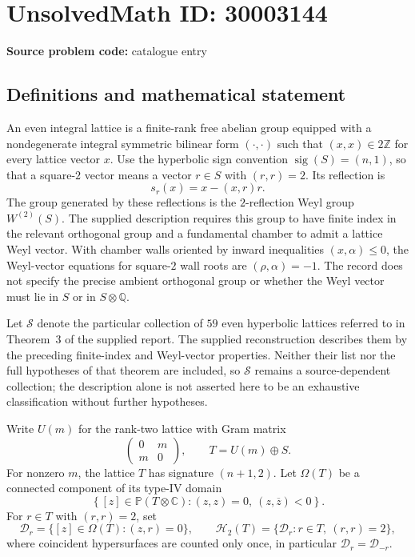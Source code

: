 \documentclass[11pt]{article}
\newcommand{\Z}{\mathbb{Z}}
\newcommand{\Q}{\mathbb{Q}}
\newcommand{\C}{\mathbb{C}}
\newcommand{\PP}{\mathbb{P}}
\begin{document}
\section*{UnsolvedMath ID: 30003144}
\textbf{Source problem code:} catalogue entry
\subsection{Definitions and mathematical statement}
An even integral lattice is a finite-rank free abelian group equipped with a nondegenerate integral symmetric bilinear form \((\cdot,\cdot)\) such that \((x,x)\in 2\Z\) for every lattice vector \(x\). Use the hyperbolic sign convention \(\operatorname{sig}(S)=(n,1)\), so that a square-\(2\) vector means a vector \(r\in S\) with \((r,r)=2\). Its reflection is
\[
 s_r(x)=x-(x,r)r.
\]
The group generated by these reflections is the \(2\)-reflection Weyl group \(W^{(2)}(S)\). The supplied description requires this group to have finite index in the relevant orthogonal group and a fundamental chamber to admit a lattice Weyl vector. With chamber walls oriented by inward inequalities \((x,\alpha)\leq 0\), the Weyl-vector equations for square-\(2\) wall roots are \((\rho,\alpha)=-1\). The record does not specify the precise ambient orthogonal group or whether the Weyl vector must lie in \(S\) or in \(S\otimes\Q\).

Let \(\mathcal S\) denote the particular collection of \(59\) even hyperbolic lattices referred to in Theorem~3 of the supplied report. The supplied reconstruction describes them by the preceding finite-index and Weyl-vector properties. Neither their list nor the full hypotheses of that theorem are included, so \(\mathcal S\) remains a source-dependent collection; the description alone is not asserted here to be an exhaustive classification without further hypotheses.

Write \(U(m)\) for the rank-two lattice with Gram matrix
\[
 \begin{pmatrix}0&m\\m&0\end{pmatrix},
 \qquad T=U(m)\oplus S.
\]
For nonzero \(m\), the lattice \(T\) has signature \((n+1,2)\). Let \(\Omega(T)\) be a connected component of its type-IV domain
\[
 \left\{[z]\in\PP(T\otimes\C):(z,z)=0,\ (z,\overline z)<0\right\}.
\]
For \(r\in T\) with \((r,r)=2\), set
\[
 \mathcal D_r=\{[z]\in\Omega(T):(z,r)=0\},
 \qquad
 \mathscr H_2(T)=\{\mathcal D_r:r\in T,\ (r,r)=2\},
\]
where coincident hypersurfaces are counted only once, in particular \(\mathcal D_r=\mathcal D_{-r}\).
\end{document}
